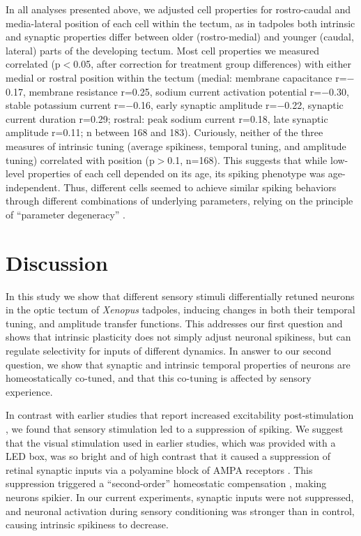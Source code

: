 \documentclass{article}
\begin{document}
In all analyses presented above, we adjusted cell properties for rostro-caudal and media-lateral position of each cell within the tectum, as in tadpoles both intrinsic \citep{hamodi2014} and synaptic properties \citep{wu1996,khakhalin2012} differ between older (rostro-medial) and younger (caudal, lateral) parts of the developing tectum. Most cell properties we measured correlated (p$<$0.05, after correction for treatment group differences) with either medial or rostral position within the tectum (medial: membrane capacitance r=$-$0.17, membrane resistance r=0.25, sodium current activation potential r=$-$0.30, stable potassium current r=$-$0.16, early synaptic amplitude r=$-$0.22, synaptic current duration r=0.29; rostral: peak sodium current r=0.18, late synaptic amplitude r=0.11; n between 168 and 183). Curiously, neither of the three measures of intrinsic tuning (average spikiness, temporal tuning, and amplitude tuning) correlated with position (p$>$0.1, n=168). This suggests that while low-level properties of each cell depended on its age, its spiking phenotype was age-independent. Thus, different cells seemed to achieve similar spiking behaviors through different combinations of underlying parameters, relying on the principle of “parameter degeneracy” \citep{prinz2004degeneracy,drion2015}.


\section*{Discussion}

In this study we show that different sensory stimuli differentially retuned neurons in the optic tectum of \textit{Xenopus} tadpoles, inducing changes in both their temporal tuning, and amplitude transfer functions. This addresses our first question and shows that intrinsic plasticity does not simply adjust neuronal spikiness, but can regulate selectivity for inputs of different dynamics. In answer to our second question, we show that synaptic and intrinsic temporal properties of neurons are homeostatically co-tuned, and that this co-tuning is affected by sensory experience.

In contrast with earlier studies that report increased excitability post-stimulation \citep{aizenman2003,dong2009,ciarleglio2015}, we found that sensory stimulation led to a suppression of spiking. We suggest that the visual stimulation used in earlier studies, which was provided with a LED box, was so bright and of high contrast that it caused a suppression of retinal synaptic inputs via a polyamine block of AMPA receptors \citep{aizenman2003}. This suppression triggered a “second-order” homeostatic compensation \citep{turrigiano2011,tien2018}, making neurons spikier. In our current experiments, synaptic inputs were not suppressed, and neuronal activation during sensory conditioning was stronger than in control, causing intrinsic spikiness to decrease.
\end{document}
